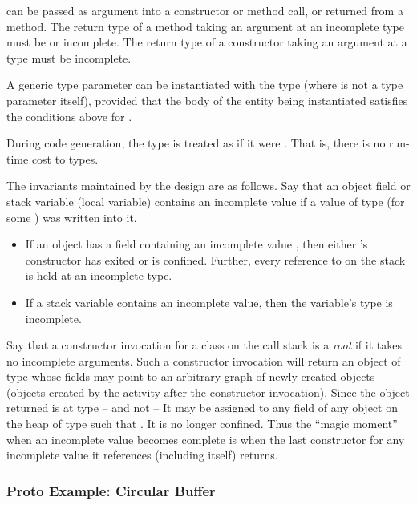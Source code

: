  can be passed as argument into a constructor or method call,
or returned from a method.  The return type of a method taking an
argument at an incomplete type must be  or incomplete.  The
return type of a constructor taking an argument at a  type
must be incomplete.
 
A generic type parameter  can be instantiated with the type  (where  is not a type parameter itself), provided that the body of
the entity being instantiated satisfies the conditions above for .

During code generation, the type  is treated as if it were
. That is, there is no run-time cost to  types.

The invariants maintained by the design are as follows.  Say that an
object field or stack variable (local variable) contains an incomplete
value if a value of type  (for some ) was written
into it.

\begin{itemize}
\item If an object  has a field containing an incomplete value ,
then either 's constructor has exited or  is confined.
Further, every reference to  on the stack is held at an incomplete type.

\item If a stack variable contains an incomplete value, then
  the variable's type is incomplete.

\end{itemize}

Say that a constructor invocation for a class  on the call
stack is a {\em root} if it takes no incomplete arguments. Such a
constructor invocation will return an object of type  whose
fields may point to an arbitrary graph of newly created objects
(objects created by the activity after the constructor
invocation). Since the object returned is at type  -- and not
 -- It may be assigned to any field of any object on the
heap of type  such that .  It is no longer
confined. Thus the ``magic moment'' when an incomplete value becomes
complete is when the last constructor for any incomplete value it
references (including itself) returns.

\subsubsection{Proto Example: Circular Buffer}

